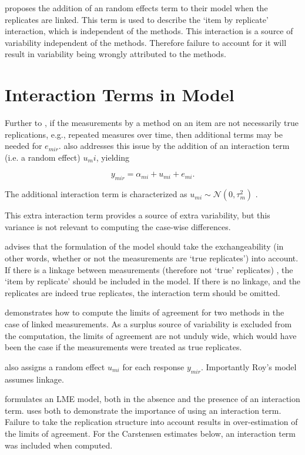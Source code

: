 \documentclass[12pt, a4paper]{report}
\theoremstyle{plain}
\theoremstyle{definition}
\theoremstyle{remark}
\begin{document}
	\citet{BXC2008} proposes the addition of an random effects term to their model when the replicates are linked. This term is used to describe the `item by replicate' interaction, which is independent of the methods. This interaction is a source of variability independent of the methods. Therefore failure to account for it will result in variability being wrongly attributed to the methods.
	
		
	
\section{Interaction Terms in Model}

Further to \citet{barnhart}, if the measurements by a method on an item are not necessarily true replications, e.g., repeated measures over time, then additional terms may be needed for $e_{mir}$. \citet{BSC2008} also addresses this issue by the addition of an interaction term (i.e. a random effect) $u_mi$, yielding

\[ y_{mir} =  \alpha_{mi} + u_{mi} + e_{mi}.  \]

The additional interaction term is characterized as $u_{mi}  \sim \mathcal{N}(0, \tau^2_m)$ \citep{BXC2008}.

This extra interaction term provides a source of extra variability, but this variance is not relevant to computing the case-wise differences.

\citet{BXC2008} advises that the formulation of the model should take the exchangeability (in other words, whether or not the measurements are `true replicates') into account. If there is a linkage between measurements (therefore not `true' replicates) , the `item by replicate' should be included in the model. If there is no linkage, and the replicates are indeed true replicates, the interaction term should be omitted.

\citet{BXC2008} demonstrates how to compute the limits of agreement for two methods in the case of linked measurements. As a surplus source of variability is excluded from the computation, the limits of agreement are not unduly wide, which would have been the case if the measurements were treated as true replicates.

\citet{Roy} also assigns a random effect $u_{mi}$ for each response $y_{mir}$. Importantly Roy's model assumes linkage.


\citet{BXC2008} formulates an LME model, both in the absence and the presence of an interaction term. \citet{BXC2008} uses both to demonstrate the importance of using an interaction term. Failure to take the replication structure into
account results in over-estimation of the limits of agreement. For the Carstensen estimates below, an interaction term was included when computed.
\end{document}
